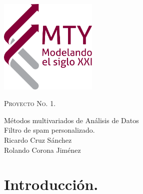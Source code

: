 \documentclass[12pt, letterpaper]{article}
\begin{document}
\begin{minipage}[c][0.6\textheight][t]{0.2\textwidth}
\begin{center}
\hskip2pt
\vrule width2.5pt height10cm
        \hskip1mm
        \vrule width1pt height10cm \\ \vspace{2cm}
        \includegraphics[height=4.5cm]{mty}
        \end{center}
\end{minipage}
\begin{minipage}[c][0.9\textheight][t]{0.65\textwidth}
  \begin{center}

	
    \vspace{3.2cm}
    

  \scshape Proyecto No. 1.\\ \normalsize
  
  \vspace{2cm}  
  
    
            
    Métodos multivariados de Análisis de Datos\\
    \vspace{1cm}   
    Filtro de spam personalizado.\\
    \vspace{1cm}   
    \vspace{1cm}   
    Ricardo Cruz Sánchez\\
    Rolando Corona Jiménez
    \vspace{.5cm}   
  \end{center}
  
\end{minipage}

\pagebreak
\tableofcontents

\cleardoublepage
\pagebreak
\section{Introducción.}
\end{document}
